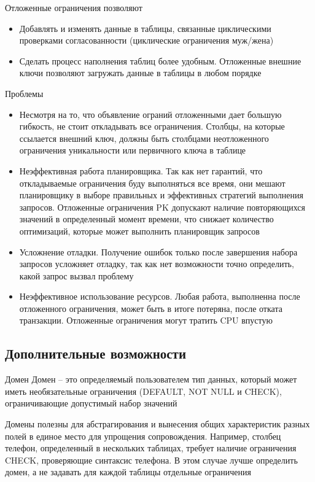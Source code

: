 \documentclass[12pt]{article}
\begin{document}
\begin{nota}{Отложенные ограничения позволяют}
    \begin{itemize}
        \item Добавлять и изменять данные в таблицы, связанные циклическими проверками согласованности (циклические ограничения муж/жена)
        \item Сделать процесс наполнения таблиц более удобным. Отложенные внешние ключи позволяют загружать данные в таблицы в любом порядке
    \end{itemize}
\end{nota}

\begin{Remark}{Проблемы}
    \begin{itemize}
        \item Несмотря на то, что объявление ограний отложенными дает большую гибкость, не стоит откладывать все ограничения. Столбцы, на которые ссылается внешний ключ, должны быть столбцами неотложенного ограничения уникальности или первичного ключа в таблице 
        \item Неэффективная работа планировщика. Так как нет гарантий, что откладываемые ограничения буду выполняться все время, они мешают планировщику в выборе правильных и эффективных стратегий выполнения запросов. Отложенные ограничения PK допускают наличие повторяющихся значений в определенный момент времени, что снижает количество оптимизаций, которые может выполнить планировщик запросов
        \item Усложнение отладки. Получение ошибок только после завершения набора запросов усложняет отладку, так как нет возможности точно определить, какой запрос вызвал проблему
        \item Неэффективное использование ресурсов. Любая работа, выполненна после отложенного ограничения, может быть в итоге потеряна, после отката транзакции. Отложенные ограничения могут тратить CPU впустую 
    \end{itemize}
\end{Remark}

\newpage

\subsection{Дополнительные возможности}

\begin{defin}{Домен}
    Домен -- это определяемый пользователем тип данных, который может иметь необязательные ограничения (DEFAULT, NOT NULL и CHECK), ограничивающие допустимый набор значений 

    Домены полезны для абстрагирования и вынесения общих характеристик разных полей в единое место для упрощения сопровождения. Например, столбец телефон, определенный в нескольких таблицах, требует наличие ограничения CHECK, проверяющие синтаксис телефона. В этом случае лучше определить домен, а не задавать для каждой таблицы отдельные ограничения 
\end{defin}
\end{document}
